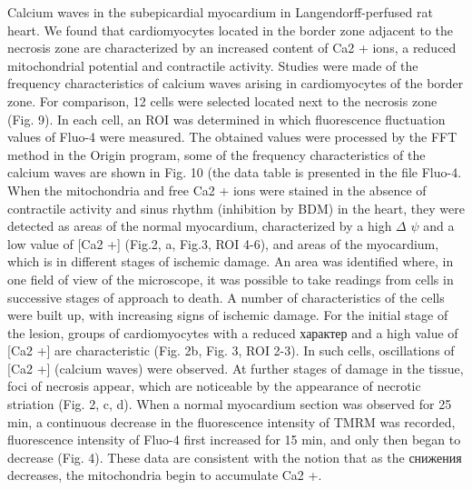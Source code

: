 \documentclass[a4paper,12pt]{article}
\begin{document}
Calcium waves in the subepicardial myocardium in Langendorff-perfused rat heart.
We found that cardiomyocytes located in the border zone adjacent to the necrosis zone are characterized by an increased content of Ca2 + ions, a reduced mitochondrial potential and contractile activity. Studies were made of the frequency characteristics of calcium waves arising in cardiomyocytes of the border zone. For comparison, 12 cells were selected located next to the necrosis zone (Fig. 9). In each cell, an ROI was determined in which fluorescence fluctuation values of Fluo-4 were measured. The obtained values were processed by the FFT method in the Origin program, some of the frequency characteristics of the calcium waves are shown in Fig. 10 (the data table is presented in the file Fluo-4.
When the mitochondria and free Ca2 + ions were stained in the absence of contractile activity and sinus rhythm (inhibition by BDM) in the heart, they were detected as areas of the normal myocardium, characterized by a high $\Delta$ $\psi$ and a low value of [Ca2 +] (Fig.2, a, Fig.3, ROI 4-6), and areas of the myocardium, which is in different stages of ischemic damage.
An area was identified where, in one field of view of the microscope, it was possible to take readings from cells in successive stages of approach to death. A number of characteristics of the cells were built up, with increasing signs of ischemic damage.
For the initial stage of the lesion, groups of cardiomyocytes with a reduced  характер and a high value of [Ca2 +] are characteristic (Fig. 2b, Fig. 3, ROI 2-3). In such cells, oscillations of [Ca2 +] (calcium waves) were observed. At further stages of damage in the tissue, foci of necrosis appear, which are noticeable by the appearance of necrotic striation (Fig. 2, c, d). When a normal myocardium section was observed for 25 min, a continuous decrease in the fluorescence intensity of TMRM was recorded, fluorescence intensity of Fluo-4 first increased for 15 min, and only then began to decrease (Fig. 4). These data are consistent with the notion that as the снижения decreases, the mitochondria begin to accumulate Ca2 +.
\end{document}
